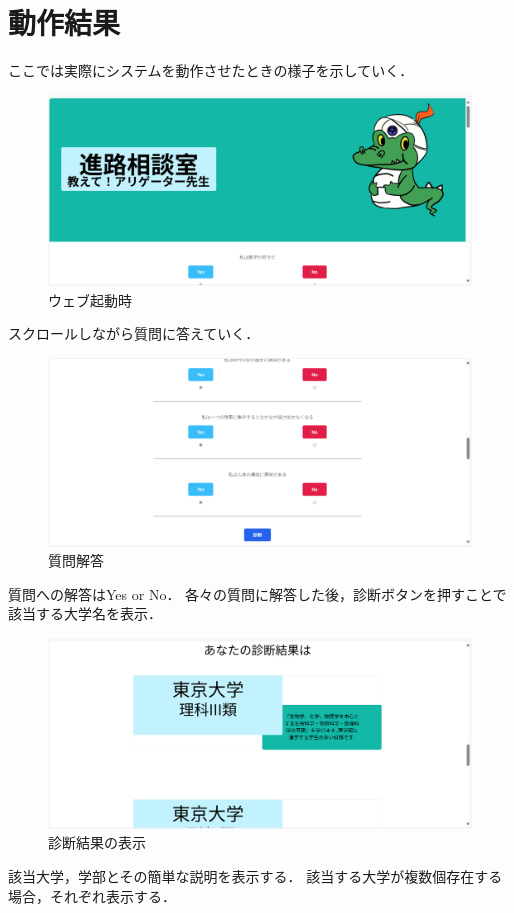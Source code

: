 \documentclass[a4j, titlepage]{jarticle}
\begin{document}
\section{動作結果}
ここでは実際にシステムを動作させたときの様子を示していく．
\newpage
\begin{figure}[htbp]
  \centering
\includegraphics[scale=0.20]{dousakekka-1.png}
\caption{ウェブ起動時}
\end{figure}

スクロールしながら質問に答えていく．

\begin{figure}[htbp]
  \centering
\includegraphics[scale=0.20]{dousakekka-2.png}
\caption{質問解答}
\end{figure}

質問への解答はYes or No．
各々の質問に解答した後，診断ボタンを押すことで該当する大学名を表示．

\begin{figure}[htbp]
  \centering
\includegraphics[scale=0.15]{dousakekka-3.png}
\caption{診断結果の表示}
\end{figure}
\newpage
該当大学，学部とその簡単な説明を表示する．
該当する大学が複数個存在する場合，それぞれ表示する．
\end{document}
